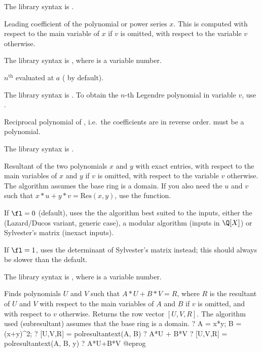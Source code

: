 The library syntax is .

\label{se:pollead}
Leading coefficient of the polynomial or power series $x$. This is
 computed with respect to the main variable of $x$ if $v$ is omitted, with
 respect to the variable $v$ otherwise.

The library syntax is , where  is a variable number.

\label{se:pollegendre}
$n^{\text{th}}$  evaluated at $a$ ( by
default).

The library syntax is .
To obtain the $n$-th Legendre polynomial in variable $v$,
use .

\label{se:polrecip}
Reciprocal polynomial of , i.e.~the coefficients are in
reverse order.  must be a polynomial.

The library syntax is .

\label{se:polresultant}
Resultant of the two
polynomials $x$ and $y$ with exact entries, with respect to the main
variables of $x$ and $y$ if $v$ is omitted, with respect to the variable $v$
otherwise. The algorithm assumes the base ring is a domain. If you also need
the $u$ and $v$ such that $x*u + y*v = \text{Res}(x,y)$, use the
 function.

If $\fl=0$ (default), uses the the algorithm best suited to the inputs,
either the  (Lazard/Ducos variant, generic case),
a modular algorithm (inputs in $\Q[X]$) or Sylvester's matrix (inexact
inputs).

If $\fl=1$, uses the determinant of Sylvester's matrix instead; this should
always be slower than the default.

The library syntax is , where  is a variable number.

\label{se:polresultantext}
Finds polynomials $U$ and $V$ such that $A*U + B*V = R$, where $R$ is
the resultant of $U$ and $V$ with respect to the main variables of $A$ and
$B$ if $v$ is omitted, and with respect to $v$ otherwise. Returns the row
vector $[U,V,R]$. The algorithm used (subresultant) assumes that the base
ring is a domain.
\bprog
? A = x*y; B = (x+y)^2;
? [U,V,R] = polresultantext(A, B)
? A*U + B*V
? [U,V,R] = polresultantext(A, B, y)
? A*U+B*V
@eprog

